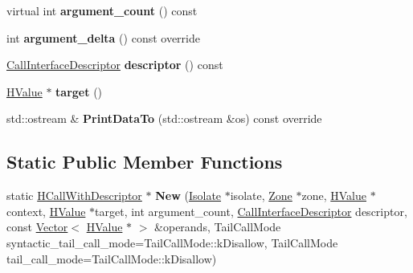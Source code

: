 \begin{DoxyCompactItemize}
\item 
virtual int {\bfseries argument\+\_\+count} () const \hypertarget{classv8_1_1internal_1_1_h_call_with_descriptor_a2d325d8689f5745972c5c934b86b792e}{}\label{classv8_1_1internal_1_1_h_call_with_descriptor_a2d325d8689f5745972c5c934b86b792e}

\item 
int {\bfseries argument\+\_\+delta} () const  override\hypertarget{classv8_1_1internal_1_1_h_call_with_descriptor_a993a7ec42cf130646bbedf082cf8a0aa}{}\label{classv8_1_1internal_1_1_h_call_with_descriptor_a993a7ec42cf130646bbedf082cf8a0aa}

\item 
\hyperlink{classv8_1_1internal_1_1_call_interface_descriptor}{Call\+Interface\+Descriptor} {\bfseries descriptor} () const \hypertarget{classv8_1_1internal_1_1_h_call_with_descriptor_a2e339359da911029f53260da27aac033}{}\label{classv8_1_1internal_1_1_h_call_with_descriptor_a2e339359da911029f53260da27aac033}

\item 
\hyperlink{classv8_1_1internal_1_1_h_value}{H\+Value} $\ast$ {\bfseries target} ()\hypertarget{classv8_1_1internal_1_1_h_call_with_descriptor_a456bfe890419d2a16885af4aba5a1f08}{}\label{classv8_1_1internal_1_1_h_call_with_descriptor_a456bfe890419d2a16885af4aba5a1f08}

\item 
std\+::ostream \& {\bfseries Print\+Data\+To} (std\+::ostream \&os) const  override\hypertarget{classv8_1_1internal_1_1_h_call_with_descriptor_aa333322b9e6d4441dc00662d3d1a1537}{}\label{classv8_1_1internal_1_1_h_call_with_descriptor_aa333322b9e6d4441dc00662d3d1a1537}

\end{DoxyCompactItemize}
\subsection*{Static Public Member Functions}
\begin{DoxyCompactItemize}
\item 
static \hyperlink{classv8_1_1internal_1_1_h_call_with_descriptor}{H\+Call\+With\+Descriptor} $\ast$ {\bfseries New} (\hyperlink{classv8_1_1internal_1_1_isolate}{Isolate} $\ast$isolate, \hyperlink{classv8_1_1internal_1_1_zone}{Zone} $\ast$zone, \hyperlink{classv8_1_1internal_1_1_h_value}{H\+Value} $\ast$context, \hyperlink{classv8_1_1internal_1_1_h_value}{H\+Value} $\ast$target, int argument\+\_\+count, \hyperlink{classv8_1_1internal_1_1_call_interface_descriptor}{Call\+Interface\+Descriptor} descriptor, const \hyperlink{classv8_1_1internal_1_1_vector}{Vector}$<$ \hyperlink{classv8_1_1internal_1_1_h_value}{H\+Value} $\ast$ $>$ \&operands, Tail\+Call\+Mode syntactic\+\_\+tail\+\_\+call\+\_\+mode=Tail\+Call\+Mode\+::k\+Disallow, Tail\+Call\+Mode tail\+\_\+call\+\_\+mode=Tail\+Call\+Mode\+::k\+Disallow)\hypertarget{classv8_1_1internal_1_1_h_call_with_descriptor_aa824e3828762676e500c37658fad4a44}{}\label{classv8_1_1internal_1_1_h_call_with_descriptor_aa824e3828762676e500c37658fad4a44}

\end{DoxyCompactItemize}
